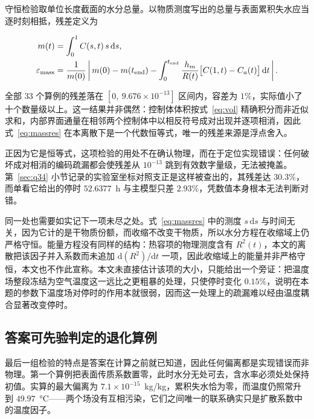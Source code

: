 守恒检验取单位长度截面的水分总量。以物质测度写出的总量与表面累积失水应当逐时刻相抵，残差定义为

\begin{equation}
\begin{aligned}
m(t)&=\int_0^1 C(s,t)\,s\,\mathrm{d}s,\\
\varepsilon_{\rm mass}&=\frac{1}{m(0)}\left|\,m(0)-m(t_{\rm end})
-\int_0^{t_{\rm end}}\frac{h_m}{R(t)}\big[C(1,t)-C_a(t)\big]\,\mathrm{d}t\,\right| .
\end{aligned}
\label{eq:massres}
\end{equation}

全部 $33$ 个算例的残差落在 $[0,\ 9.676\times10^{-13}]$ 区间内，容差为 $1\%$，实际值小了十个数量级以上。这一结果并非偶然：控制体体积按式~\eqref{eq:vol} 精确积分而非近似求和，内部界面通量在相邻两个控制体中以相反符号成对出现并逐项相消，因此式~\eqref{eq:massres} 在本离散下是一个代数恒等式，唯一的残差来源是浮点舍入。

正因为它是恒等式，这项检验的用处不在确认物理，而在于定位实现错误：任何破坏成对相消的编码疏漏都会使残差从 $10^{-13}$ 跳到有效数字量级，无法被掩盖。第~\ref{sec:q34} 小节记录的实验室坐标对照支正是这样被查出的，其残差达 $30.3\%$，而单看它给出的停时 $52.6377$~h 与主模型只差 $2.93\%$，凭数值本身根本无法判断对错。

同一处也需要如实记下一项未尽之处。式~\eqref{eq:massres} 中的测度 $s\,\mathrm{d}s$ 与时间无关，因为它计的是干物质份额，而收缩不改变干物质，所以水分方程在收缩域上仍严格守恒。能量方程没有同样的结构：热容项的物理测度含有 $R^2(t)$，本文的离散把该因子并入系数而未追加 $\mathrm{d}(R^2)/\mathrm{d}t$ 一项，因此收缩域上的能量并非严格守恒，本文也不作此宣称。本文未直接估计该项的大小，只能给出一个旁证：把温度场整段冻结为空气温度这一远比之更粗暴的处理，只使停时变化 $0.15\%$，说明在本题的参数下温度场对停时的作用本就很弱，因而这一处理上的疏漏难以经由温度耦合显著改变停时。

\subsection{答案可先验判定的退化算例}

最后一组检验的特点是答案在计算之前就已知道，因此任何偏离都是实现错误而非物理。第一个算例把表面传质系数置零，此时水分无处可去，含水率必须处处保持初值。实算的最大偏离为 $7.1\times10^{-15}$~kg/kg，累积失水恰为零，而温度仍照常升到 $49.97$~°C——两个场没有互相污染，它们之间唯一的联系确实只是扩散系数中的温度因子。

